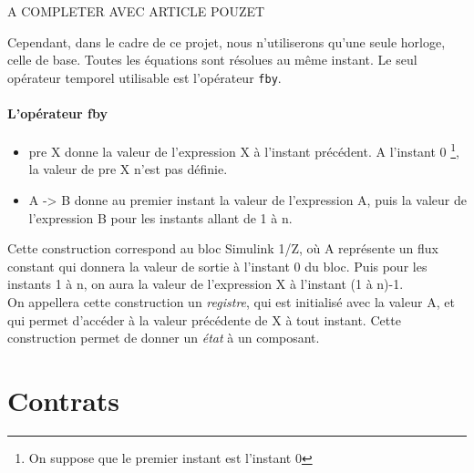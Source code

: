 A COMPLETER AVEC ARTICLE POUZET

Cependant, dans le cadre de ce projet, nous n'utiliserons qu'une seule horloge,
celle de base. Toutes les équations sont résolues au même instant. 
Le seul opérateur temporel utilisable est l'opérateur \texttt{fby}. 

\paragraph{L'opérateur fby}

\begin{itemize}
\item pre X donne la valeur de l'expression X à l'instant précédent. A
l'instant 0 \footnote{On suppose que le premier instant est l'instant
0}, la valeur de pre X n'est pas définie. 
\item A -> B donne au premier instant la valeur de l'expression A, 
puis la valeur de l'expression B pour les instants allant de 1 à n. 
\end{itemize}

Cette construction correspond au bloc Simulink 1/Z, où A représente un
flux constant qui donnera la valeur de sortie à l'instant 0 du
bloc. Puis pour les instants 1 à n, on aura la valeur de l'expression
X à l'instant (1 à n)-1. \\
On appellera cette construction un \emph{registre}, qui est initialisé avec la
valeur A, et qui permet d'accéder à la valeur précédente de X à tout
instant. Cette construction permet de donner un \emph{état} à un composant.


\section{Contrats}

